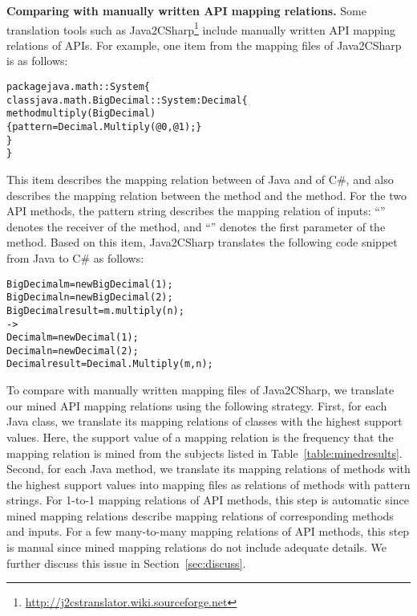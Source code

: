 \textbf{Comparing with manually written API mapping relations.} Some translation
tools such as
Java2CSharp\footnote{\url{http://j2cstranslator.wiki.sourceforge.net}}
include manually written API mapping relations of APIs.
For example, one item from the mapping files of Java2CSharp is as
follows:

\begin{CodeOut}\vspace*{-2ex}
\begin{alltt}
package java.math :: System \{
  class java.math.BigDecimal :: System:Decimal \{
    method multiply(BigDecimal)
       \{ pattern =  Decimal.Multiply(@0, @1); \}
  \}
\}
\end{alltt}
\end{CodeOut}\vspace*{-2ex}

This item describes the mapping relation between  of Java and  of C\#, and also describes the mapping relation between the 
method and the  method. For the two API methods, the pattern
string describes the mapping relation of inputs:
``'' denotes the receiver of the 
method, and ``'' denotes the first parameter of the
 method. Based on this item, Java2CSharp translates
the following code snippet from Java to C\# as follows:

\begin{CodeOut}\vspace*{-2ex}
\begin{alltt}
  BigDecimal m = new BigDecimal(1);
  BigDecimal n = new BigDecimal(2);
  BigDecimal result = m.multiply(n);
  ->
  Decimal m = new Decimal(1);
  Decimal n = new Decimal(2);
  Decimal result = Decimal.Multiply(m,n);
\end{alltt}
\end{CodeOut}\vspace*{-2ex}

To compare with manually written mapping files of Java2CSharp, we
translate our mined API mapping relations using the following strategy. First,
for each Java class, we translate its mapping relations of classes
with the highest support values. Here, the support value of a mapping relation is the frequency that the mapping relation is mined from the subjects listed in Table~\ref{table:minedresults}. Second, for each Java method, we translate its
mapping relations of methods with the highest support values into mapping
files as relations of methods with pattern strings. For 1-to-1
mapping relations of API methods, this step is automatic since mined
mapping relations describe mapping relations of corresponding
methods and inputs. For a few many-to-many mapping relations of API methods,
this step is manual since mined mapping relations do not include
adequate details. We further discuss this issue in Section~\ref{sec:discuss}.

